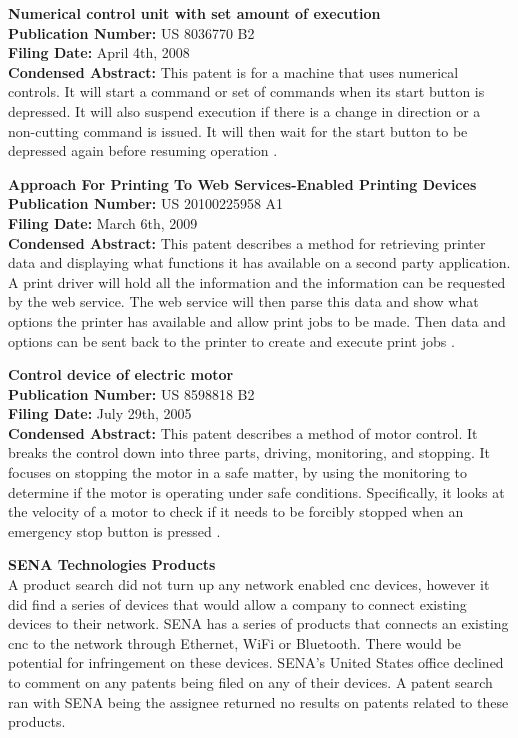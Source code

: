 \textbf{Numerical control unit with set amount of execution} \\
\textbf{Publication Number:} US 8036770 B2 \\
\textbf{Filing Date:} April 4th, 2008 \\
\textbf{Condensed Abstract:}
This patent is for a machine that uses numerical controls.
It will start a command or set of commands when its start button is depressed.
It will also suspend execution if there is a change in direction or a non-cutting command is issued.
It will then wait for the start button to be depressed again before resuming operation \cite{executionpatent}.

\textbf{Approach For Printing To Web Services-Enabled Printing Devices} \\
\textbf{Publication Number:} US 20100225958 A1 \\
\textbf{Filing Date:} March 6th, 2009 \\
\textbf{Condensed Abstract:}
This patent describes a method for retrieving printer data and displaying what functions it has available on a second party application.
A print driver will hold all the information and the information can be requested by the web service.
The web service will then parse this data and show what options the printer has available and allow print jobs to be made.
Then data and options can be sent back to the printer to create and execute print jobs \cite{webservicepatent}.

\textbf{Control device of electric motor} \\
\textbf{Publication Number:} US 8598818 B2 \\
\textbf{Filing Date:} July 29th, 2005 \\
\textbf{Condensed Abstract:}
This patent describes a method of motor control. 
It breaks the control down into three parts, driving, monitoring, and stopping.
It focuses on stopping the motor in a safe matter, by using the monitoring to determine if the motor is operating under safe conditions.
Specifically, it looks at the velocity of a motor to check if it needs to be forcibly stopped when an emergency stop button is pressed \cite{motorcontrolpatent}.

\textbf{SENA Technologies Products} \\
A product search did not turn up any network enabled \gls{cnc} devices, however it did find a series of devices that would allow a company to connect existing devices to their network.
SENA has a series of products that connects an existing \gls{cnc} to the network through Ethernet, WiFi or Bluetooth.
There would be potential for infringement on these devices.
SENA’s United States office declined to comment on any patents being filed on any of their devices.
A patent search ran with SENA being the assignee returned no results on patents related to these products.

